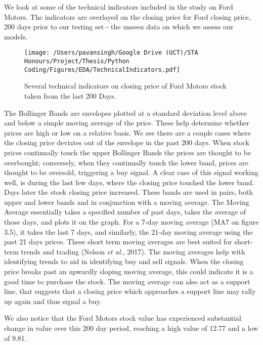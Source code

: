 We look at some of the technical indicators included in the study on Ford Motors. The indicators are overlayed on the closing price for Ford closing price, 200 days prior to our testing set - the unseen data on which we assess our models.

\begin{figure}[!h]
\centering
  \texttt{[image: /Users/pavansingh/Google Drive (UCT)/STA Honours/Project/Thesis/Python Coding/Figures/EDA/TechnicalIndicators.pdf]}
  \caption{Several technical indicators on closing price of Ford Motors stock taken from the last 200 Days.}
  \label{}
\end{figure}

The Bollinger Bands are envelopes plotted at a standard deviation level above and below a simple moving average of the price. These help determine whether prices are high or low on a relative basis. We see there are a couple cases where the closing price deviates out of the envelope in the past 200 days. When stock prices continually touch the upper Bollinger Bands the prices are thought to be overbought; conversely, when they continually touch the lower band, prices are thought to be oversold, triggering a buy signal. A clear case of this signal working well, is during the last few days, where the closing price touched the lower band. Days later the stock closing price increased.  These bands are used in pairs, both upper and lower bands and in conjunction with a moving average. The Moving Average essentially takes a specified number of past days, takes the average of those days, and plots it on the graph. For a 7-day moving average (MA7 on figure 3.5), it takes the last 7 days, and similarly, the 21-day moving average using the past 21 days prices. These short term moving averages are best suited for short-term trends and trading (Nelson \textit{et al.}, 2017). The moving averages help with identifying trends to aid in identifying buy and sell signals. When the closing price breaks past an upwardly sloping moving average, this could indicate it is a good time to purchase the stock. The moving average can also act as a support line, that suggests that a closing price which approaches a support line may rally up again and thus signal a buy. 

We also notice that the Ford Motors stock value has experienced substantial change in value over this 200 day period, reaching a high value of 12.77 and a low of 9.81. 


